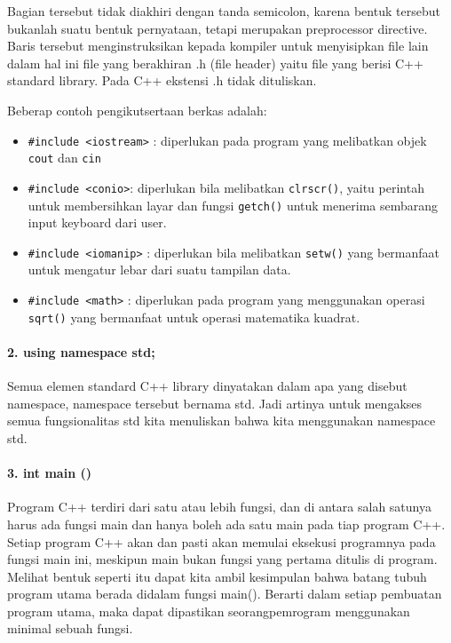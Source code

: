 Bagian tersebut tidak diakhiri dengan tanda semicolon, karena bentuk
tersebut bukanlah suatu bentuk pernyataan, tetapi merupakan preprocessor
directive. Baris tersebut menginstruksikan kepada kompiler untuk
menyisipkan file lain dalam hal ini file yang berakhiran .h (file
header) yaitu file yang berisi C++ standard library. Pada C++ ekstensi
.h tidak dituliskan.

Beberap contoh pengikutsertaan berkas adalah:

\begin{itemize}

\item
  \texttt{\#include\ \textless{}iostream\textgreater{}} : diperlukan
  pada program yang melibatkan objek \texttt{cout} dan \texttt{cin}
\item
  \texttt{\#include\ \textless{}conio\textgreater{}}: diperlukan bila
  melibatkan \texttt{clrscr()}, yaitu perintah untuk membersihkan layar
  dan fungsi \texttt{getch()} untuk menerima sembarang input keyboard
  dari user.
\item
  \texttt{\#include\ \textless{}iomanip\textgreater{}} : diperlukan bila
  melibatkan \texttt{setw()} yang bermanfaat untuk mengatur lebar dari
  suatu tampilan data.
\item
  \texttt{\#include\ \textless{}math\textgreater{}} : diperlukan pada
  program yang menggunakan operasi \texttt{sqrt()} yang bermanfaat untuk
  operasi matematika kuadrat.
\end{itemize}

\paragraph{2. using namespace std;}\label{using-namespace-std}

Semua elemen standard C++ library dinyatakan dalam apa yang disebut
namespace, namespace tersebut bernama std. Jadi artinya untuk mengakses
semua fungsionalitas std kita menuliskan bahwa kita menggunakan
namespace std.

\paragraph{3. int main ()}\label{int-main}

Program C++ terdiri dari satu atau lebih fungsi, dan di antara salah
satunya harus ada fungsi main dan hanya boleh ada satu main pada tiap
program C++. Setiap program C++ akan dan pasti akan memulai eksekusi
programnya pada fungsi main ini, meskipun main bukan fungsi yang pertama
ditulis di program. Melihat bentuk seperti itu dapat kita ambil
kesimpulan bahwa batang tubuh program utama berada didalam fungsi
main(). Berarti dalam setiap pembuatan program utama, maka dapat
dipastikan seorangpemrogram menggunakan minimal sebuah fungsi.

